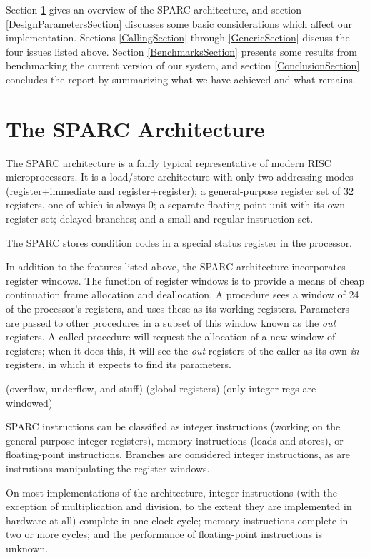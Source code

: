 Section \ref{SparcSection} gives an overview of the SPARC architecture, and
section \ref{DesignParametersSection} discusses some basic considerations
which affect our implementation.  Sections \ref{CallingSection} through
\ref{GenericSection} discuss the four issues listed above.  Section
\ref{BenchmarksSection} presents some results from benchmarking the current
version of our system, and section \ref{ConclusionSection} concludes the
report by summarizing what we have achieved and what remains.

\section{The SPARC Architecture}
\label{SparcSection}

The SPARC \cite{SPARC} architecture is a fairly typical representative of
modern RISC microprocessors. It is a load/store architecture with only two
addressing modes (register+immediate and register+register); a
general-purpose register set of 32 registers, one of which is always 0;
a separate floating-point unit with its own register set; delayed branches;
and a small and regular instruction set. 

The SPARC stores condition codes in a special status register in the
processor.

In addition to the features listed above, the SPARC architecture
incorporates register windows\cite{someone}. The function of register
windows is to provide a
means of cheap continuation frame allocation and deallocation. A procedure
sees a window of 24 of the processor's registers, and uses these as its
working registers. Parameters are passed to other procedures in a
subset of this window known as the {\em out} registers. A called procedure
will request the allocation of a new window of registers; when it does this,
it will see the {\em out} registers of the caller as its own {\em in} 
registers, in which it expects to find its parameters.

(overflow, underflow, and stuff)
(global registers)
(only integer regs are windowed)

SPARC instructions can be classified as integer instructions (working on the
general-purpose integer registers), memory instructions (loads and
stores), or floating-point instructions. Branches are considered integer
instructions, as are instrutions manipulating the register windows.

On most implementations of the architecture, integer instructions (with the
exception of multiplication and division, to the extent they are implemented
in hardware at all) complete in one clock cycle; memory instructions
complete in two or more cycles; and the performance of floating-point
instructions is unknown.

